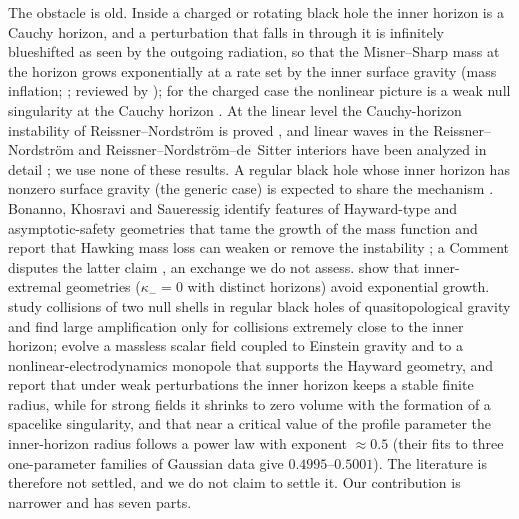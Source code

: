 \documentclass[11pt]{article}
\begin{document}
The obstacle is old. Inside a charged or rotating black hole the inner horizon is a Cauchy horizon, and a perturbation that falls in through it is infinitely blueshifted as seen by the outgoing radiation, so that the Misner--Sharp mass \citep{MisnerSharp1964} at the horizon grows exponentially at a rate set by the inner surface gravity (mass inflation; \citealt{PoissonIsrael1990,Ori1991}; reviewed by \citealt{HamiltonAvelino2010}); for the charged case the nonlinear picture is a weak null singularity at the Cauchy horizon \citep{Dafermos2005}. At the linear level the Cauchy-horizon instability of Reissner--Nordstr\"om is proved \citep{LukOh2017}, and linear waves in the Reissner--Nordstr\"om and Reissner--Nordstr\"om--de~Sitter interiors have been analyzed in detail \citep{KehleShlapentokhRothman2019,HintzVasy2017,CostaFranzen2017}; we use none of these results. A regular black hole whose inner horizon has nonzero surface gravity (the generic case) is expected to share the mechanism \citep{CarballoRubio2018,CarballoRubio2021}. Bonanno, Khosravi and Saueressig identify features of Hayward-type and asymptotic-safety geometries that tame the growth of the mass function \citep{Bonanno2021} and report that Hawking mass loss can weaken or remove the instability \citep{Bonanno2023}; a Comment disputes the latter claim \citep{CarballoRubio2023Comment}, an exchange we do not assess. \citet{CarballoRubio2022b} show that inner-extremal geometries ($\kappa_-=0$ with distinct horizons) avoid exponential growth. \citet{FrolovZelnikov2026} study collisions of two null shells in regular black holes of quasitopological gravity and find large amplification only for collisions extremely close to the inner horizon; \citet{ShaoEtAl2025} evolve a massless scalar field coupled to Einstein gravity and to a nonlinear-electrodynamics monopole that supports the Hayward geometry, and report that under weak perturbations the inner horizon keeps a stable finite radius, while for strong fields it shrinks to zero volume with the formation of a spacelike singularity, and that near a critical value of the profile parameter the inner-horizon radius follows a power law with exponent $\approx0.5$ (their fits to three one-parameter families of Gaussian data give $0.4995$--$0.5001$). The literature is therefore not settled, and we do not claim to settle it. Our contribution is narrower and has seven parts.
\end{document}
